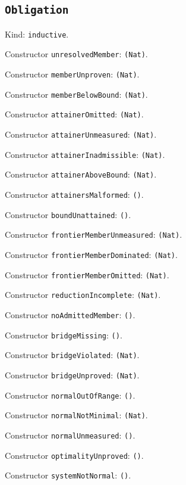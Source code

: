 \documentclass[11pt]{article}
\begin{document}
\subsection*{\texttt{Obligation}}
\noindent Kind: \texttt{inductive}.\par
\noindent Constructor \texttt{unresolvedMember}: \texttt{(Nat)}.\par
\noindent Constructor \texttt{memberUnproven}: \texttt{(Nat)}.\par
\noindent Constructor \texttt{memberBelowBound}: \texttt{(Nat)}.\par
\noindent Constructor \texttt{attainerOmitted}: \texttt{(Nat)}.\par
\noindent Constructor \texttt{attainerUnmeasured}: \texttt{(Nat)}.\par
\noindent Constructor \texttt{attainerInadmissible}: \texttt{(Nat)}.\par
\noindent Constructor \texttt{attainerAboveBound}: \texttt{(Nat)}.\par
\noindent Constructor \texttt{attainersMalformed}: \texttt{()}.\par
\noindent Constructor \texttt{boundUnattained}: \texttt{()}.\par
\noindent Constructor \texttt{frontierMemberUnmeasured}: \texttt{(Nat)}.\par
\noindent Constructor \texttt{frontierMemberDominated}: \texttt{(Nat)}.\par
\noindent Constructor \texttt{frontierMemberOmitted}: \texttt{(Nat)}.\par
\noindent Constructor \texttt{reductionIncomplete}: \texttt{(Nat)}.\par
\noindent Constructor \texttt{noAdmittedMember}: \texttt{()}.\par
\noindent Constructor \texttt{bridgeMissing}: \texttt{()}.\par
\noindent Constructor \texttt{bridgeViolated}: \texttt{(Nat)}.\par
\noindent Constructor \texttt{bridgeUnproved}: \texttt{(Nat)}.\par
\noindent Constructor \texttt{normalOutOfRange}: \texttt{()}.\par
\noindent Constructor \texttt{normalNotMinimal}: \texttt{(Nat)}.\par
\noindent Constructor \texttt{normalUnmeasured}: \texttt{()}.\par
\noindent Constructor \texttt{optimalityUnproved}: \texttt{()}.\par
\noindent Constructor \texttt{systemNotNormal}: \texttt{()}.\par
\end{document}
